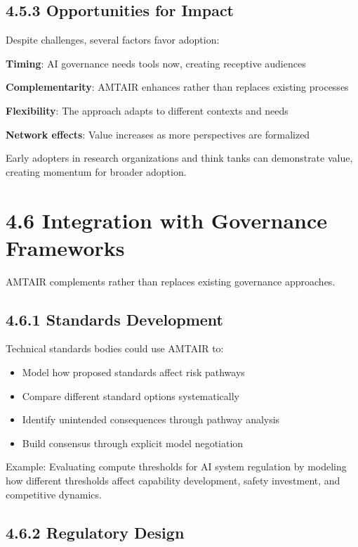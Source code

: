 \documentclass[
  11pt,
  letterpaper,
]{book}
\providecommand{\tightlist}{%
  \setlength{\itemsep}{0pt}\setlength{\parskip}{0pt}}
\begin{document}
\subsection{4.5.3 Opportunities for
Impact}\label{sec-impact-opportunities}

Despite challenges, several factors favor adoption:

\textbf{Timing}: AI governance needs tools now, creating receptive
audiences

\textbf{Complementarity}: AMTAIR enhances rather than replaces existing
processes

\textbf{Flexibility}: The approach adapts to different contexts and
needs

\textbf{Network effects}: Value increases as more perspectives are
formalized

Early adopters in research organizations and think tanks can demonstrate
value, creating momentum for broader adoption.

\section{4.6 Integration with Governance
Frameworks}\label{sec-governance-integration}

AMTAIR complements rather than replaces existing governance approaches.

\subsection{4.6.1 Standards
Development}\label{sec-standards-integration}

Technical standards bodies could use AMTAIR to:

\begin{itemize}
\tightlist
\item
  Model how proposed standards affect risk pathways
\item
  Compare different standard options systematically
\item
  Identify unintended consequences through pathway analysis
\item
  Build consensus through explicit model negotiation
\end{itemize}

Example: Evaluating compute thresholds for AI system regulation by
modeling how different thresholds affect capability development, safety
investment, and competitive dynamics.

\subsection{4.6.2 Regulatory Design}\label{sec-regulatory-integration}
\end{document}
